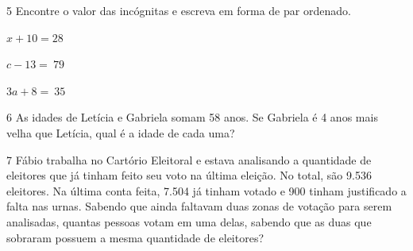 \num{5} Encontre o valor das incógnitas e escreva em forma de par ordenado.

\begin{escolha}[itemsep=0pt]
\item $x + 10 = 28$ 
\item $c - 13 = \ 79$ 
\item $3a + 8 = \ 35$ 
\end{escolha}


\num{6} As idades de Letícia e Gabriela somam 58 anos. Se Gabriela é 4 anos
mais velha que Letícia, qual é a idade de cada uma?


\num{7} Fábio trabalha no Cartório Eleitoral e estava analisando a quantidade
de eleitores que já tinham feito seu voto na última eleição. No total,
são 9.536 eleitores. Na última conta feita, 7.504 já tinham votado e 900
tinham justificado a falta nas urnas. Sabendo que ainda faltavam duas
zonas de votação para serem analisadas, quantas pessoas votam em uma
delas, sabendo que as duas que sobraram possuem a mesma quantidade de
eleitores?

